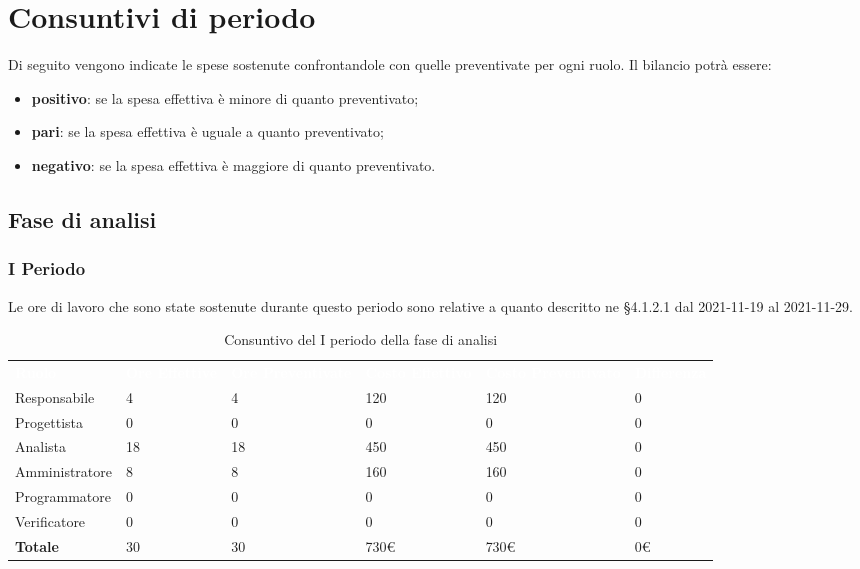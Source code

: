 \section{Consuntivi di periodo}
Di seguito vengono indicate le spese sostenute confrontandole con quelle preventivate per ogni ruolo.  Il bilancio potrà essere:
\begin{itemize}
\item \textbf{positivo}: se la spesa effettiva è minore di quanto preventivato;
\item \textbf{pari}: se la spesa effettiva è uguale a quanto preventivato;
\item \textbf{negativo}: se la spesa effettiva è maggiore di quanto preventivato.
\end{itemize}

\subsection{Fase di analisi}
\subsubsection{I Periodo}
Le ore di lavoro che sono state sostenute durante questo periodo sono relative a quanto descritto ne §4.1.2.1 dal 2021-11-19 al 2021-11-29.

\begin{table}[H]
\begin{center}
\renewcommand{\arraystretch}{1.5}
\begin{tabular}{ m{}<{\centering}  m{}<{\centering} m{}<{\centering} m{}<{\centering} m{}<{\centering} m{}<{\centering}}
	\rowcolor{darkblue}
	\textcolor{white}{\textbf{Ruolo}} & \textcolor{white}{\textbf{Ore Effettive}} & \textcolor{white}{\textbf{Ore Preventivate}}&\textcolor{white}{\textbf{Costo Effettivo}}&\textcolor{white}{\textbf{Costo Preventivato}}&\textcolor{white}{\textbf{Differenza}}\\  

	Responsabile  & 4 & 4 & 120 & 120 & 0\\	
	
	Progettista & 0 & 0 & 0 & 0 & 0\\
	
	Analista & 18 & 18 & 450 & 450 & 0\\
	
	Amministratore & 8 & 8 & 160 & 160 & 0\\
	
	Programmatore & 0 & 0 &0 &0 & 0\\
	
	Verificatore & 0 & 0 & 0 & 0 & 0\\
	
	\textbf{Totale} & 30 & 30 & 730\euro & 730\euro & 0\euro \\
	
\end{tabular}
\caption{Consuntivo del I periodo della fase di analisi}
\end{center}
\end{table}



